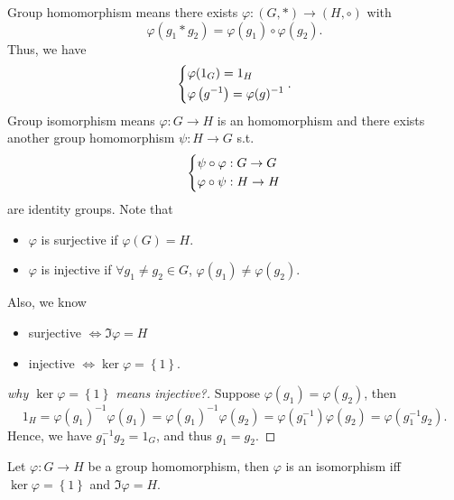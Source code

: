 \begin{prev}
    Group homomorphism means there exists \(\varphi : (G, *) \to (H, \circ )\) with
    \[
        \varphi (g_1 * g_2) = \varphi (g_1) \circ \varphi (g_2).
    \]
    Thus, we have 
    \[
        \begin{dcases}
            \varphi (1_G) = 1_H \\
            \varphi \left( g^{-1} \right) = \varphi (g)^{-1}
        \end{dcases}.
    \]  
        Group isomorphism means \(\varphi: G \to H\) is an homomorphism and there exists another group homomorphism \(\psi : H \to G\) s.t. 
        \[
            \begin{dcases}
                \psi \circ \varphi : G \to G \\
                \varphi \circ \psi : H \to H
            \end{dcases}
        \] are identity groups. Note that 
        \begin{itemize}
            \item \(\varphi \) is surjective if \(\varphi (G) = H\). 
            \item \(\varphi \) is injective if \(\forall g_1 \neq g_2 \in G\), \(\varphi (g_1) \neq \varphi (g_2)\).      
        \end{itemize}
        Also, we know 
        \begin{itemize}
            \item surjective \(\iff \Im \varphi = H\)
            \item injective \(\iff \ker \varphi = \left\{ 1 \right\} \).   
        \end{itemize}
\end{prev}

\begin{proof}[why \(\ker \varphi = \left\{ 1 \right\} \) means injective?]
    Suppose \(\varphi (g_1) = \varphi (g_2)\), then
    \[
        1_H = \varphi (g_1)^{-1}\varphi (g_1) = \varphi (g_1)^{-1} \varphi (g_2) = \varphi \left( g_1^{-1} \right) \varphi (g_2) = \varphi \left( g_1^{-1} g_2 \right).  
    \] 
    Hence, we have \(g_1^{-1} g_2 = 1_G\), and thus \(g_1 = g_2\).  
\end{proof}

\begin{theorem}
    Let \(\varphi :G \to H\) be a group homomorphism, then \(\varphi \) is an isomorphism iff \(\ker \varphi = \left\{ 1 \right\} \) and \(\Im \varphi = H\).     
\end{theorem}
